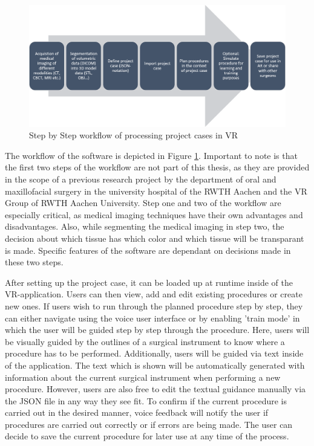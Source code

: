 \begin{figure}[ht!]
    \centering
    \includegraphics[width=\linewidth]{images/implementation/workflow.png}
    \caption{\label{fig::ImplementationWorkflow}Step by Step workflow of processing project cases in VR}
\end{figure}

The workflow of the software is depicted in Figure \ref{fig::ImplementationWorkflow}.
Important to note is that the first two steps of the workflow are not part of this thesis, as they are provided in the scope of a previous research project by the department of oral and maxillofacial surgery in the university hospital of the RWTH Aachen and the VR Group of RWTH Aachen University.
Step one and two of the workflow are especially critical, as medical imaging techniques have their own advantages and disadvantages.
Also, while segmenting the medical imaging in step two, the decision about which tissue has which color and which tissue will be transparant is made.
Specific features of the software are dependant on decisions made in these two steps.



After setting up the project case, it can be loaded up at runtime inside of the VR-application.
Users can then view, add and edit existing procedures or create new ones.
If users wish to run through the planned procedure step by step, they can either navigate using the voice user interface or by enabling 'train mode' in which the user will be guided step by step through the procedure.
Here, users will be visually guided by the outlines of a surgical instrument to know where a procedure has to be performed.
Additionally, users will be guided via text inside of the application.
The text which is shown will be automatically generated with information about the current surgical instrument when performing a new procedure.
However, users are also free to edit the textual guidance manually via the JSON file in any way they see fit.
To confirm if the current procedure is carried out in the desired manner, voice feedback will notify the user if procedures are carried out correctly or if errors are being made.
The user can decide to save the current procedure for later use at any time of the process.